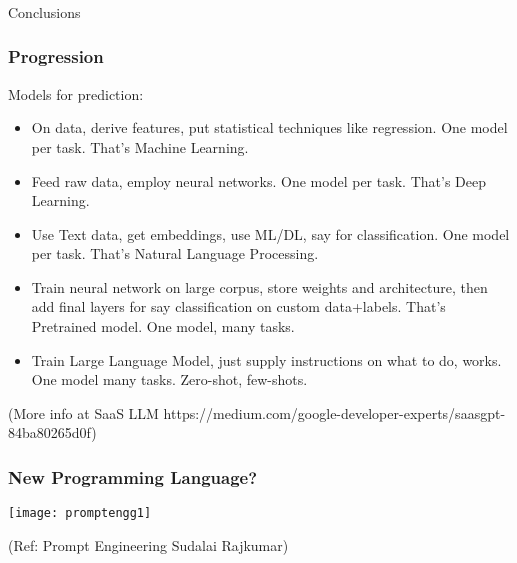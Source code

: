 \begin{frame}[fragile]\frametitle{}
\begin{center}
{\Large Conclusions}
\end{center}
\end{frame}

\begin{frame}[fragile]\frametitle{Progression}

Models for prediction:

\begin{itemize}
\item On data, derive features, put statistical techniques like regression. One model per task. That's Machine Learning.
\item Feed raw data, employ neural networks. One model per task. That's Deep Learning.
\item Use Text data, get embeddings, use ML/DL, say for classification. One model per task. That's Natural Language Processing.
\item Train neural network on large corpus, store weights and architecture, then add final layers for say classification on custom data+labels. That's Pretrained model. One model, many tasks.
\item Train Large Language Model, just supply instructions on what to do, works. One model many tasks. Zero-shot, few-shots.
\end{itemize}

{\tiny (More info at SaaS LLM https://medium.com/google-developer-experts/saasgpt-84ba80265d0f)}

\end{frame}


\begin{frame}[fragile]\frametitle{New Programming Language?}

\begin{center}
\texttt{[image: promptengg1]}

{\tiny (Ref: Prompt Engineering Sudalai Rajkumar)}

\end{center}				

\end{frame}


